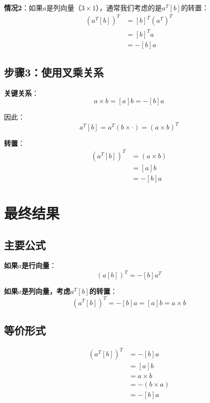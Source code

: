 \documentclass[12pt,a4paper]{article}
\begin{document}
\textbf{情况2}：如果$a$是列向量（$3 \times 1$），通常我们考虑的是$a^T [b]$的转置：
\begin{align}
(a^T [b])^T &= [b]^T (a^T)^T \\
&= [b]^T a \\
&= -[b] a
\end{align}

\subsection{步骤3：使用叉乘关系}

\textbf{关键关系}：
\begin{equation}
a \times b = [a] b = -[b] a
\end{equation}

因此：
\begin{equation}
a^T [b] = a^T (b \times \cdot) = (a \times b)^T
\end{equation}

\textbf{转置}：
\begin{align}
(a^T [b])^T &= (a \times b) \\
&= [a] b \\
&= -[b] a
\end{align}

\section{最终结果}

\subsection{主要公式}

\textbf{如果$a$是行向量}：
\begin{equation}
(a[b])^T = -[b] a^T
\end{equation}

\textbf{如果$a$是列向量，考虑$a^T [b]$的转置}：
\begin{equation}
(a^T [b])^T = -[b] a = [a] b = a \times b
\end{equation}

\subsection{等价形式}

\begin{align}
(a^T [b])^T &= -[b] a \\
&= [a] b \\
&= a \times b \\
&= -(b \times a) \\
&= -[b] a
\end{align}
\end{document}
